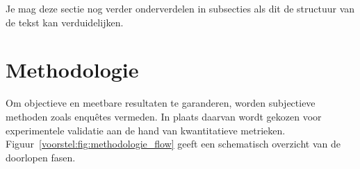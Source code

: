 %
%
%
%
%

Je mag deze sectie nog verder onderverdelen in subsecties als dit de structuur van de tekst kan verduidelijken.

\section{Methodologie}%
\label{sec:methodologie}

Om objectieve en meetbare resultaten te garanderen, worden subjectieve methoden zoals enquêtes vermeden. In plaats daarvan wordt gekozen voor experimentele validatie aan de hand van kwantitatieve metrieken. Figuur~\ref{voorstel:fig:methodologie_flow} geeft een schematisch overzicht van de doorlopen fasen.

